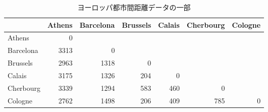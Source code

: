 \begin{table}[ht]
	\centering
	\caption{ヨーロッパ都市間距離データの一部}
	\begin{tabular}{l|rrrrrr}
		          & Athens & Barcelona & Brussels & Calais & Cherbourg & Cologne \\
		\hline
		Athens    & 0      &           &          &        &           &         \\
		Barcelona & 3313   & 0         &          &        &           &         \\
		Brussels  & 2963   & 1318      & 0        &        &           &         \\
		Calais    & 3175   & 1326      & 204      & 0      &           &         \\
		Cherbourg & 3339   & 1294      & 583      & 460    & 0         &         \\
		Cologne   & 2762   & 1498      & 206      & 409    & 785       & 0       \\
		\hline
	\end{tabular}
	\label{tbl::15_01}
\end{table}
